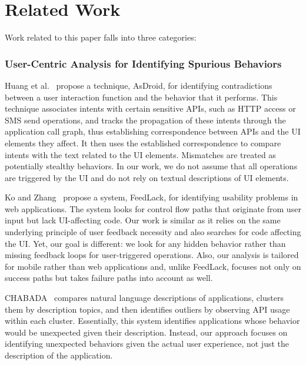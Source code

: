 \section{Related Work}
\label{sec:related}
Work related to this paper falls into three categories:

\vspace{-0.05in}
\subsubsection{User-Centric Analysis for Identifying Spurious Behaviors}
Huang et al.~\cite{Huang:Zhang:Tan:Wang:Liang:ICSE14} propose a technique, AsDroid, for identifying contradictions between a user interaction function and the behavior that it performs. 
This technique associates intents with certain sensitive APIs, such as HTTP access or SMS send operations, and tracks the propagation
of these intents through the application call graph, thus establishing correspondence between APIs and the UI elements they affect. 
It then uses the established correspondence to compare intents with the text related to the UI elements. Mismatches are treated as potentially stealthy behaviors. 
In our work, we do not assume that all operations are triggered by the UI
and do not rely on textual descriptions of UI elements.

Ko and Zhang~\cite{Ko:Zhang:CHI11} propose a system, FeedLack, for identifying usability problems in web applications. The system looks for control flow paths that originate from user input but lack UI-affecting code. Our work is similar as it relies on the same underlying principle 
of user feedback necessity and also searches for code affecting the UI. Yet, our goal is different: we look for any hidden behavior rather than missing feedback loops for user-triggered operations. Also, our analysis is tailored for mobile rather than web applications and, unlike FeedLack, focuses not only on success paths but takes failure paths into account as well.   

CHABADA~\cite{Gorla:Tavecchia:Gross:Zeller:ICSE14} compares natural language descriptions of applications, clusters them by description topics, and then identifies outliers by observing API usage within each cluster. Essentially, this system identifies applications whose behavior would be unexpected given their description. Instead, our approach focuses on identifying unexpected behaviors given the actual user experience, not just the description of the application.

